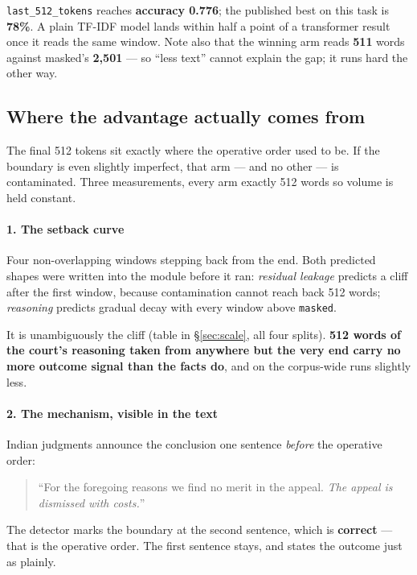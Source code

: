 \documentclass[12pt,a4paper]{article}
\newcommand{\code}[1]{\texttt{\small #1}}
\begin{document}
\code{last\_512\_tokens} reaches \textbf{accuracy 0.776}; the published best on this task is
\textbf{78\%}. A plain TF-IDF model lands within half a point of a transformer result once it reads
the same window. Note also that the winning arm reads \textbf{511} words against masked's
\textbf{2,501} --- so ``less text'' cannot explain the gap; it runs hard the other way.

\subsection{Where the advantage actually comes from}\label{sec:contamination}

The final 512 tokens sit exactly where the operative order used to be. If the boundary is even
slightly imperfect, that arm --- and no other --- is contaminated. Three measurements, every arm
exactly 512 words so volume is held constant.

\paragraph{1. The setback curve} Four non-overlapping windows stepping back from the end. Both
predicted shapes were written into the module before it ran: \emph{residual leakage} predicts a
cliff after the first window, because contamination cannot reach back 512 words; \emph{reasoning}
predicts gradual decay with every window above \code{masked}.

It is unambiguously the cliff (table in §\ref{sec:scale}, all four splits). \textbf{512 words of the
court's reasoning taken from anywhere but the very end carry no more outcome signal than the facts
do}, and on the corpus-wide runs slightly less.

\paragraph{2. The mechanism, visible in the text} Indian judgments announce the conclusion one
sentence \emph{before} the operative order:

\begin{quote}
``For the foregoing reasons we find no merit in the appeal. \emph{The appeal is dismissed with
costs.}''
\end{quote}

The detector marks the boundary at the second sentence, which is \textbf{correct} --- that is the
operative order. The first sentence stays, and states the outcome just as plainly.
\end{document}
